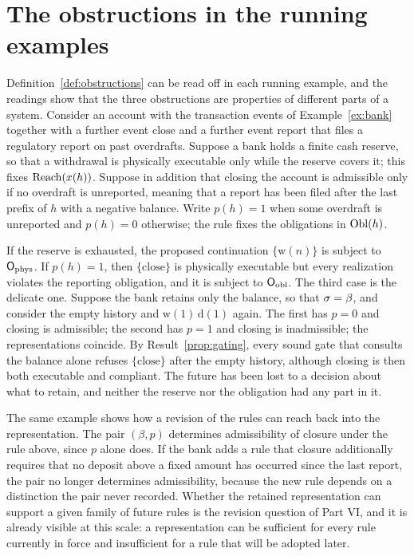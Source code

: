

\section{The obstructions in the running examples}\label{sec:obstructions-examples}

Definition~\ref{def:obstructions} can be read off in each running example, and the readings show that the three obstructions are properties of different parts of a system. Consider an account with the transaction events of Example~\ref{ex:bank} together with a further event $\mathrm{close}$ and a further event $\mathrm{report}$ that files a regulatory report on past overdrafts. Suppose a bank holds a finite cash reserve, so that a withdrawal is physically executable only while the reserve covers it; this fixes $\operatorname{Reach}(x(h))$. Suppose in addition that closing the account is admissible only if no overdraft is unreported, meaning that a report has been filed after the last prefix of $h$ with a negative balance. Write $p(h)=1$ when some overdraft is unreported and $p(h)=0$ otherwise; the rule fixes the obligations in $\operatorname{Obl}(h)$.

If the reserve is exhausted, the proposed continuation $\{\mathrm{w}(n)\}$ is subject to $\mathsf{O}_{\mathrm{phys}}$. If $p(h)=1$, then $\{\mathrm{close}\}$ is physically executable but every realization violates the reporting obligation, and it is subject to $\mathsf{O}_{\mathrm{obl}}$. The third case is the delicate one. Suppose the bank retains only the balance, so that $\sigma=\beta$, and consider the empty history and $\mathrm{w}(1)\,\mathrm{d}(1)$ again. The first has $p=0$ and closing is admissible; the second has $p=1$ and closing is inadmissible; the representations coincide. By Result~\ref{prop:gating}, every sound gate that consults the balance alone refuses $\{\mathrm{close}\}$ after the empty history, although closing is then both executable and compliant. The future has been lost to a decision about what to retain, and neither the reserve nor the obligation had any part in it.

The same example shows how a revision of the rules can reach back into the representation. The pair $(\beta,p)$ determines admissibility of closure under the rule above, since $p$ alone does. If the bank adds a rule that closure additionally requires that no deposit above a fixed amount has occurred since the last report, the pair no longer determines admissibility, because the new rule depends on a distinction the pair never recorded. Whether the retained representation can support a given family of future rules is the revision question of Part VI, and it is already visible at this scale: a representation can be sufficient for every rule currently in force and insufficient for a rule that will be adopted later.


